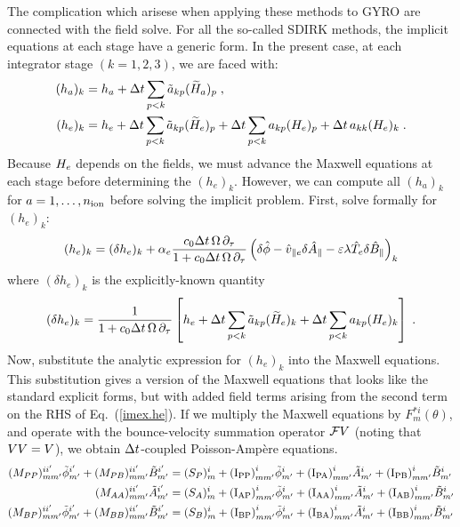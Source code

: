 The complication which arisese when applying these methods to GYRO are 
connected with the field solve.  For all the so-called SDIRK methods, 
the implicit equations at each stage have a generic form.  In the 
present case, at each integrator stage $(k=1,2,3)$, we are faced with:
%
\begin{align}
(h_a)_k & = h_a + {\Delta t} \sum_{p<k} {\tilde a}_{kp} ({\widetilde H}_a)_p 
\label{imex.ion} \; , \\
(h_e)_k & = h_e + {\Delta t} \sum_{p<k} {\tilde a}_{kp} ({\widetilde H}_e)_p 
                + {\Delta t} \sum_{p<k} a_{kp} (H_e)_p + {\Delta t} \, 
                a_{kk} (H_e)_k \; .
\label{imex.elec}
\end{align}
%
Because $H_e$ depends on the fields, we must advance the Maxwell 
equations at each stage before determining the $(h_e)_k$.  However, 
we can compute all $(h_a)_k$ for $a=1,\ldots,n_{\rm ion}$ before solving 
the implicit problem.  First, solve formally for $(h_e)_k$:
%
\begin{equation}
(h_e)_k = (\delta h_e)_k + \alpha_e \frac{c_0 {\Delta t} \, \Omega \, \partial_\tau}{1+c_0 {\Delta t} \, \Omega \, \partial_\tau} 
\left( \delta \hat{\phi} 
- \hat{v}_{\parallel e} \delta \hat{A}_{\parallel} 
- \varepsilon \lambda \hat{T}_{e} \delta \hat{B}_{\parallel} \right)_k 
\label{imex.he}
\end{equation}
%
where $(\delta h_e)_k$ is the explicitly-known quantity
%
\begin{equation}
(\delta h_e)_k = 
\frac{1}{1+c_0 {\Delta t} \, \Omega \, \partial_\tau} \left[ h_e + {\Delta t} \sum_{p<k} {\tilde a}_{kp} ({\widetilde H}_e)_k 
          + {\Delta t} \sum_{p<k} a_{kp} (H_e)_k \right ] \; .
\label{imex.dhe}
\end{equation}
% 
Now, substitute the analytic expression for $(h_e)_k$ into the Maxwell 
equations.  This substitution gives a version of the Maxwell equations 
that looks like the standard explicit forms, but with added field 
terms arising from the second term on the RHS of Eq.~(\ref{imex.he}).
If we multiply the Maxwell equations by $F_m^{*i}(\theta)$, and operate 
with the bounce-velocity summation operator ${\cal F}V$ (noting that 
$VV=V$), we obtain ${\Delta t}$-coupled Poisson-Amp\`ere equations.
%
\begin{align}
(M_{PP})_{mm^\prime}^{ii^\prime} {\tilde{\phi}}_{m^\prime}^{i^\prime} 
   + (M_{PB})_{mm^\prime}^{ii^\prime}  {\tilde{B}}_{m^\prime}^{i^\prime} & = 
  (S_P)_m^i + {({\rm I}_{\rm PP})}^i_{mm^\prime} {\tilde{\phi}}_{m^\prime}^i 
              + {({\rm I}_{\rm PA})}^i_{mm^\prime} {\tilde{A}}_{m^\prime}^i 
              + {({\rm I}_{\rm PB})}^i_{mm^\prime} {\tilde{B}}_{m^\prime}^i \\
(M_{AA})_{mm^\prime}^{ii^\prime} {\tilde{A}}_{m^\prime}^{i^\prime} & = 
  (S_A)_m^i + {({\rm I}_{\rm AP})}^i_{mm^\prime} {\tilde{\phi}}_{m^\prime}^i  
              + {({\rm I}_{\rm AA})}^i_{mm^\prime} {\tilde{A}}_{m^\prime}^i
              + {({\rm I}_{\rm AB})}^i_{mm^\prime} {\tilde{B}}_{m^\prime}^i \\
(M_{BP})_{mm^\prime}^{ii^\prime} {\tilde{\phi}}_{m^\prime}^{i^\prime} 
   + (M_{BB})_{mm^\prime}^{ii^\prime}  {\tilde{B}}_{m^\prime}^{i^\prime} & = 
  (S_B)_m^i + {({\rm I}_{\rm BP})}^i_{mm^\prime} {\tilde{\phi}}_{m^\prime}^i 
              + {({\rm I}_{\rm BA})}^i_{mm^\prime} {\tilde{A}}_{m^\prime}^i 
              + {({\rm I}_{\rm BB})}^i_{mm^\prime} {\tilde{B}}_{m^\prime}^i 
\end{align}

